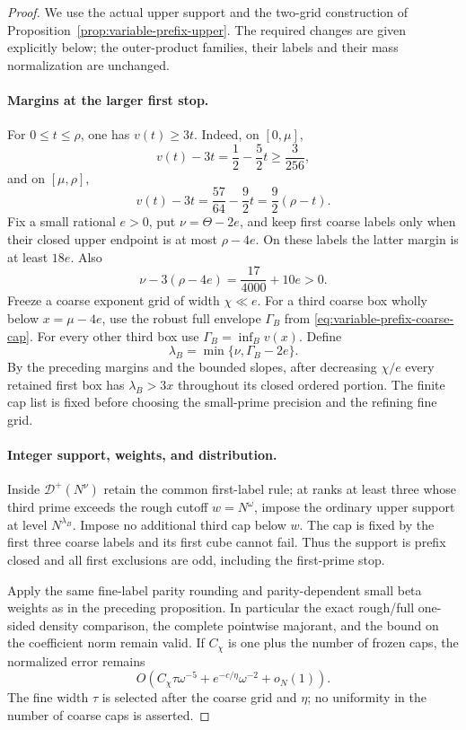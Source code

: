 \documentclass[11pt]{article}
\begin{document}
\begin{proof}
We use the actual upper support and the two-grid construction of
Proposition~\ref{prop:variable-prefix-upper}. The required changes
are given explicitly below; the outer-product families, their
labels and their mass normalization are unchanged.

\paragraph{Margins at the larger first stop.}
For $0\le t\le\rho$, one has $v(t)\ge3t$. Indeed,
on $[0,\mu]$,
\[
 v(t)-3t=\frac12-\frac52t\ge\frac3{256},
\]
and on $[\mu,\rho]$,
\[
 v(t)-3t=\frac{57}{64}-\frac92t
                   =\frac92(\rho-t).
\]
Fix a small rational $e>0$, put $\nu=\Theta-2e$, and keep
first coarse labels only when their closed upper endpoint is
at most $\rho-4e$. On these labels the latter margin is at least
$18e$. Also
\[
 \nu-3(\rho-4e)=\frac{17}{4000}+10e>0.
\]
Freeze a coarse exponent grid of width $\chi\ll e$. For a
third coarse box wholly below $x=\mu-4e$, use the robust full
envelope $\Gamma_B$ from
\eqref{eq:variable-prefix-coarse-cap}. For every other third box
use $\Gamma_B=\inf_B v(x)$. Define
\[
 \lambda_B=\min\{\nu,\Gamma_B-2e\}.
\]
By the preceding margins and the bounded slopes, after decreasing
$\chi/e$ every retained first box has
$\lambda_B>3x$ throughout its closed ordered portion.
The finite cap list is fixed before choosing the small-prime
precision and the refining fine grid.

\paragraph{Integer support, weights, and distribution.}
Inside $\mathcal D^+(N^\nu)$ retain the common first-label rule;
at ranks at least three whose third prime exceeds the rough
cutoff $w=N^\omega$, impose the ordinary upper support at
level $N^{\lambda_B}$. Impose no additional third cap below $w$.
The cap is fixed by the first three coarse labels and its first
cube cannot fail. Thus the support is prefix closed and all
first exclusions are odd, including the first-prime stop.

Apply the same fine-label parity rounding and parity-dependent
small beta weights as in the preceding proposition. In particular
the exact rough/full one-sided density comparison, the complete
pointwise majorant, and the bound on the coefficient norm remain
valid. If $C_\chi$ is one plus the number of frozen caps, the
normalized error remains
\[
 O(C_\chi\tau\omega^{-5}
                 +e^{-c/\eta}\omega^{-2}+o_N(1)).
\]
The fine width $\tau$ is selected after the coarse grid and
$\eta$; no uniformity in the number of coarse caps is asserted.


\end{proof}
\end{document}
